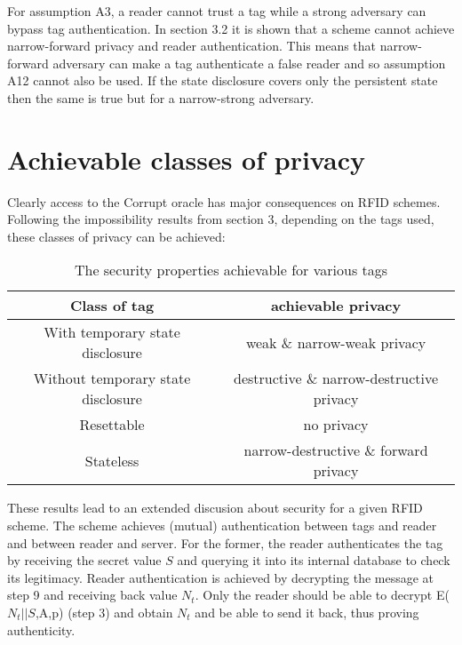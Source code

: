     For assumption A3, a reader cannot trust a tag while a strong adversary can bypass tag authentication. In section 3.2 it is shown 
    that a scheme cannot
    achieve narrow-forward privacy and reader authentication. This means that narrow-forward adversary can make a tag authenticate
    a false reader and so assumption A12 cannot also be used. If the state disclosure covers only the persistent state then the same is
    true but for a narrow-strong adversary.

\section{Achievable classes of privacy}

    Clearly access to the Corrupt oracle has major consequences on RFID schemes. Following the impossibility results from section 3, 
    depending on the tags used, these classes of privacy can be achieved:

    \begin{table}[H]
    \centering
    \caption{The security properties achievable for various tags}
    \begin{tabular}{| c | c |}
        \hline
        Class of tag & achievable privacy \\
        \hline
        With temporary state disclosure & weak \& narrow-weak privacy\\
        Without temporary state disclosure & destructive \& narrow-destructive privacy\\
        Resettable & no privacy \\
        Stateless & narrow-destructive \& forward privacy \\
        \hline
    \end{tabular}
    \end{table}

    These results lead to an extended discusion about security for a given RFID scheme. The \cite{BOM} scheme achieves (mutual)
    authentication between tags and reader and between reader and server. For the former, the reader authenticates the tag by
    receiving the secret value $S$ and querying it into its internal database to check its legitimacy. Reader authentication is
    achieved by decrypting the message at step 9 and receiving back value $N_t$. Only the reader should be able to decrypt 
    E($N_t||S$,A,p) (step 3) and obtain $N_t$ and be able to send it back, thus proving authenticity.
    
